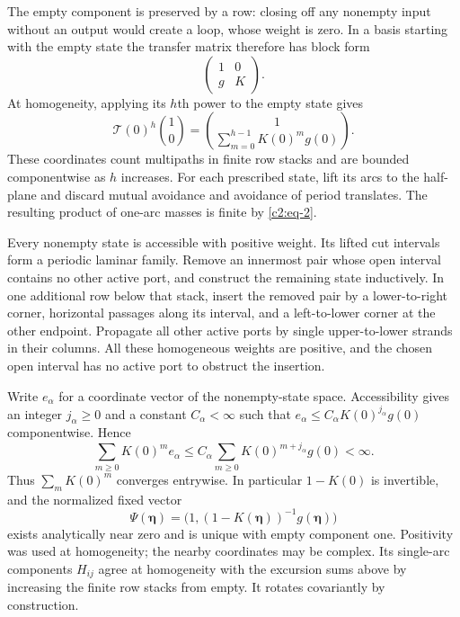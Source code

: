 The empty component is preserved by a row: closing off any nonempty
input without an output would create a loop, whose weight is zero.
In a basis starting with the empty state the transfer matrix therefore has
block form
\[
 \begin{pmatrix}1&0\\ g&K\end{pmatrix}.
\]
At homogeneity, applying its $h$th power to the empty state gives
\[
 \mathcal T(0)^h\binom{1}{0}
 =\binom{1}{\sum_{m=0}^{h-1}K(0)^m g(0)}.
\]
These coordinates count multipaths in finite row stacks and are bounded
componentwise as $h$ increases.  For each prescribed state, lift its arcs
to the half-plane and discard mutual avoidance and avoidance of period
translates.  The resulting product of one-arc masses is finite by
\eqref{c2:eq-2}.

Every nonempty state is accessible with positive weight.  Its lifted cut
intervals form a periodic laminar family.  Remove an innermost pair whose
open interval contains no other active port, and construct the remaining
state inductively.  In one additional row below that stack, insert the
removed pair by a lower-to-right corner, horizontal passages along its
interval, and a left-to-lower corner at the other endpoint.  Propagate
all other active ports by single upper-to-lower strands in their columns.
All these homogeneous weights are positive, and the chosen open interval
has no active port to obstruct the insertion.

Write $e_\alpha$ for a coordinate vector of the nonempty-state space.
Accessibility gives an integer $j_\alpha\ge0$ and a constant
$C_\alpha<\infty$ such that
$e_\alpha\le C_\alpha K(0)^{j_\alpha}g(0)$ componentwise.  Hence
\[
 \sum_{m\ge0}K(0)^m e_\alpha
 \le C_\alpha\sum_{m\ge0}K(0)^{m+j_\alpha}g(0)<\infty.
\]
Thus $\sum_m K(0)^m$ converges entrywise.  In particular $1-K(0)$ is
invertible, and the normalized fixed vector
\[
 \Psi(\boldsymbol\eta)
 =\bigl(1,(1-K(\boldsymbol\eta))^{-1}g(\boldsymbol\eta)\bigr)
\]
exists analytically near zero and is unique with empty component one.
Positivity was used at homogeneity; the nearby coordinates may be complex.
Its single-arc components \(H_{ij}\) agree at homogeneity with the excursion sums above by increasing the finite row stacks from empty. It rotates covariantly by construction.


